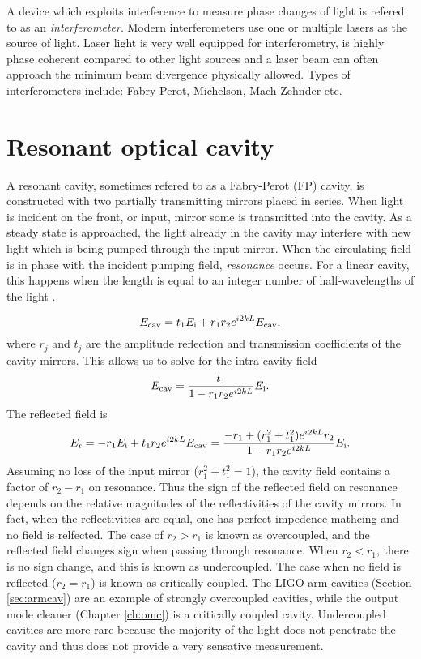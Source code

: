 A device which exploits interference to measure phase changes of light is refered to as an \emph{interferometer}. %
Modern interferometers use one or multiple lasers as the source of light. %
Laser light is very well equipped for interferometry, is highly phase coherent compared to other light sources and a laser beam can often approach the minimum beam divergence physically allowed. %
Types of interferometers include: Fabry-Perot, Michelson, Mach-Zehnder etc.

\section{Resonant optical cavity}
A resonant cavity, sometimes refered to as a Fabry-Perot (FP) cavity, is constructed with two partially transmitting mirrors placed in series. %
When light is incident on the front, or input, mirror some is transmitted into the cavity. %
As a steady state is approached, the light already in the cavity may interfere with new light which is being pumped through the input mirror. %
When the circulating field is in phase with the incident pumping field, \emph{resonance} occurs. %
For a linear cavity, this happens when the length is equal to an integer number of half-wavelengths of the light \cite{Siegman}.

\begin{equation}
E_{\rm{cav}}=t_1 E_{\rm i} + r_1 r_2 e^{i 2 k L} E_{\rm{cav}},
\end{equation}
where $r_j$ and $t_j$ are the amplitude reflection and transmission coefficients of the cavity mirrors. %
This allows us to solve for the intra-cavity field
\begin{equation}
E_{\rm{cav}}=\frac{t_1}{1 - r_1 r_2 e^{i 2 k L}} E_{\rm i}.
\end{equation}
The reflected field is
\begin{equation}
E_{\rm{r}}=-r_1 E_{\rm i} + t_1r_2 e^{i 2 k L} E_{\rm{cav}}=\frac{-r_1+(r_1^2+t_1^2)e^{i2kL}r_2}{1-r_1r_2e^{i2kL}}E_{\rm i}.
\end{equation}
Assuming no loss of the input mirror ($r_1^2+t_1^2=1$), the cavity field contains a factor of $r_2-r_1$ on resonance. %
Thus the sign of the reflected field on resonance depends on the relative magnitudes of the reflectivities of the cavity mirrors. %
In fact, when the reflectivities are equal, one has perfect impedence mathcing and no field is relfected. %
The case of $r_2>r_1$ is known as overcoupled, and the reflected field changes sign when passing through resonance. %
When $r_2<r_1$, there is no sign change, and this is known as undercoupled. %
The case when no field is reflected ($r_2=r_1$) is known as critically coupled. %
The LIGO arm cavities (Section \ref{sec:armcav}) are an example of strongly overcoupled cavities, while the output mode cleaner (Chapter \ref{ch:omc}) is a critically coupled cavity. %
Undercoupled cavities are more rare because the majority of the light does not penetrate the cavity and thus does not provide a very sensative measurement.

